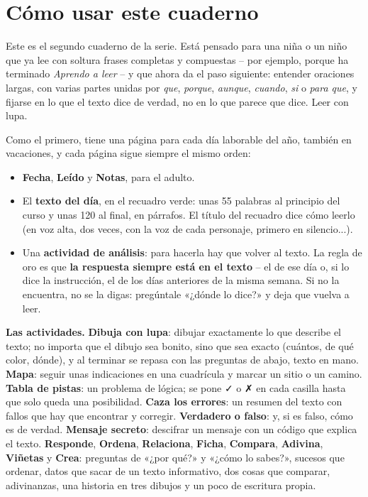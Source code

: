 \section*{Cómo usar este cuaderno}

Este es el segundo cuaderno de la serie. Está pensado para una niña o un
niño que ya lee con soltura frases completas y compuestas -- por
ejemplo, porque ha terminado \textit{Aprendo a leer} -- y que ahora da el
paso siguiente: entender oraciones largas, con varias partes unidas por
\textit{que}, \textit{porque}, \textit{aunque}, \textit{cuando},
\textit{si} o \textit{para que}, y fijarse en lo que el texto dice de
verdad, no en lo que parece que dice. Leer con lupa.

Como el primero, tiene una página para cada día laborable del año,
también en vacaciones, y cada página sigue siempre el mismo orden:

\begin{itemize}[leftmargin=6mm, itemsep=1mm]
\item \textbf{Fecha}, \textbf{Leído} y \textbf{Notas}, para el adulto.
\item El \textbf{texto del día}, en el recuadro verde: unas 55 palabras
  al principio del curso y unas 120 al final, en párrafos. El título del
  recuadro dice cómo leerlo (en voz alta, dos veces, con la voz de cada
  personaje, primero en silencio...).
\item Una \textbf{actividad de análisis}: para hacerla hay que volver al
  texto. La regla de oro es que \textbf{la respuesta siempre está en el
  texto} -- el de ese día o, si lo dice la instrucción, el de los días
  anteriores de la misma semana. Si no la encuentra, no se la digas:
  pregúntale «¿dónde lo dice?» y deja que vuelva a leer.
\end{itemize}

\textbf{Las actividades.} \textbf{Dibuja con lupa}: dibujar exactamente
lo que describe el texto; no importa que el dibujo sea bonito, sino que
sea exacto (cuántos, de qué color, dónde), y al terminar se repasa con
las preguntas de abajo, texto en mano. \textbf{Mapa}: seguir unas
indicaciones en una cuadrícula y marcar un sitio o un camino.
\textbf{Tabla de pistas}: un problema de lógica; se pone ✓ o
✗ en cada casilla hasta que solo queda una posibilidad.
\textbf{Caza los errores}: un resumen del texto con fallos que hay que
encontrar y corregir. \textbf{Verdadero o falso}: y, si es falso, cómo es
de verdad. \textbf{Mensaje secreto}: descifrar un mensaje con un código
que explica el texto. \textbf{Responde}, \textbf{Ordena},
\textbf{Relaciona}, \textbf{Ficha}, \textbf{Compara}, \textbf{Adivina},
\textbf{Viñetas} y \textbf{Crea}: preguntas de «¿por qué?» y «¿cómo
lo sabes?», sucesos que ordenar, datos que sacar de un texto
informativo, dos cosas que comparar, adivinanzas, una historia en tres
dibujos y un poco de escritura propia.

